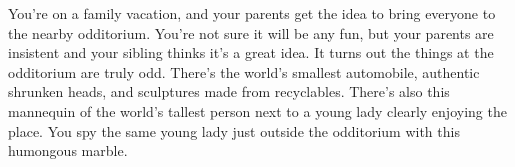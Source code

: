 You're on a family vacation, and your parents get the idea to bring everyone to the nearby odditorium. You're not sure it will be any fun, but your parents are insistent and your sibling thinks it's a great idea. It turns out the things at the odditorium are truly odd. There's the world's smallest automobile, authentic shrunken heads, and sculptures made from recyclables. There's also this mannequin of the world's tallest person next to a young lady clearly enjoying the place. You spy the same young lady just outside the odditorium with this humongous marble.